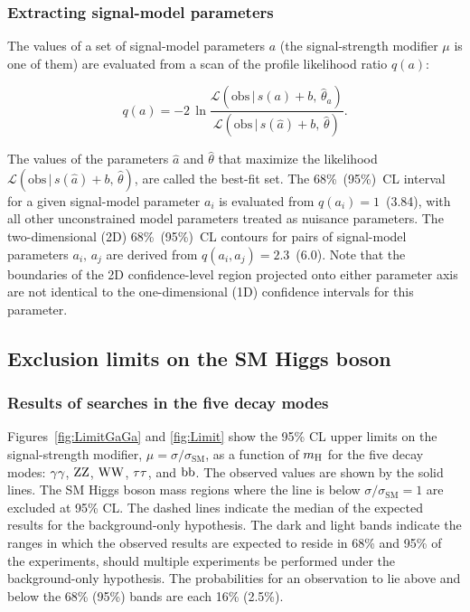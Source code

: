 \documentclass[12pt,twoside,a4paper,cmspaper,final,collab]{cms-tdr}
\begin{document}
\subsubsection{Extracting signal-model parameters}



The values of a set of signal-model parameters $a$ (the signal-strength modifier $\mu$ is one of them)
are evaluated from a scan of the profile likelihood ratio $q(a)$:



\begin{equation}
q(a) = - 2 \, \ln \frac {\mathcal{L}(\text{obs} \, | \, s(a) + b,      \, \hat \theta_{a} ) }
                      {\mathcal{L}(\text{obs} \, | \, s(\hat a) + b, \, \hat \theta ) } .
\end{equation}

The values of the parameters $\hat a$ and $\hat \theta$
that maximize the likelihood
$\mathcal{L}(\text{obs} \, | \, s(\hat a) + b, \, \hat \theta )$,
are called the best-fit set.
The 68\%~(95\%)~CL interval for a given signal-model parameter $a_i$ is evaluated from $q(a_i)=1$~(3.84),
with all other unconstrained model parameters treated as nuisance parameters.
The two-dimensional (2D) 68\%~(95\%)~CL contours for pairs of signal-model parameters $a_i,\, a_j$ are derived
from $q(a_i, a_j) = 2.3$~(6.0).
Note that the boundaries of the 2D confidence-level region projected onto
either parameter axis are not identical to the one-dimensional (1D) confidence intervals for this parameter.





\subsection{Exclusion limits on the SM Higgs boson}

\subsubsection{Results of searches in the five decay modes}
\label{sec:SubchannelLimits}

Figures~\ref{fig:LimitGaGa} and \ref{fig:Limit}
show the 95\% CL upper limits on the signal-strength modifier,
$\mu = \sigma / \sigma_{\mathrm{SM}}$,
as a function of $m_{\mathrm{H}}$ for the five decay modes:
$\gamma\gamma$, $\mathrm{Z}\mathrm{Z}$, $\mathrm{W}\mathrm{W}$, $\tau\tau$, and $\mathrm{b}\mathrm{b}$.
The observed values are shown by the solid lines.
The SM Higgs boson mass regions where the line is below $\sigma / \sigma_{\mathrm{SM}}= 1$ are excluded at 95\% CL.
The dashed lines indicate the median of the expected results for
the background-only hypothesis. The dark  and light bands
indicate the ranges in which
the observed results are expected to reside in
68\% and 95\% of the experiments, should multiple experiments be performed under the background-only hypothesis.
The probabilities for an observation to lie above and below the 68\% (95\%) bands are each 16\% (2.5\%).
\end{document}
